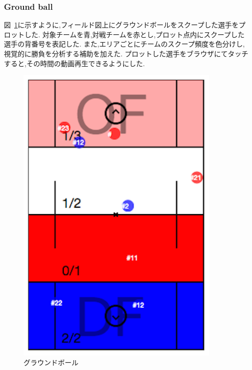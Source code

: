 \documentclass[sotsuron]{kuee}
\begin{document}
			\subsubsection{Ground ball}
				図~\ref{fig:gb}に示すように,フィールド図上にグラウンドボールをスクープした選手をプロットした. 対象チームを青,対戦チームを赤とし,プロット点内にスクープした選手の背番号を表記した. また,エリアごとにチームのスクープ頻度を色分けし,視覚的に勝負を分析する補助を加えた. 
				プロットした選手をブラウザにてタッチすると,その時間の動画再生できるようにした. 
					\begin{figure}
						\begin{center}
							\includegraphics[width=10cm]{./png/gb.png}
						\end{center}
						\caption{グラウンドボール}
				  		\label{fig:gb}
					\end{figure}
\end{document}
